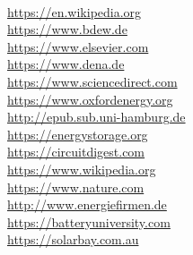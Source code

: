 \begin{parcolumns}[colwidths={1=5 cm, 2=10 cm}]{2}
{\\ \url{https://en.wikipedia.org} \\ \url{https://www.bdew.de} \\ \url{https://www.elsevier.com} \\ \url{https://www.dena.de} \\ \url{https://www.sciencedirect.com} \\ \url{https://www.oxfordenergy.org} \\ \url{http://epub.sub.uni-hamburg.de}
\\ \url{https://energystorage.org} \\ \url{https://circuitdigest.com} \\ \url{https://www.wikipedia.org} \\ \url{https://www.nature.com} \\ \url{http://www.energiefirmen.de} \\ \url{https://batteryuniversity.com} \\ \url{https://solarbay.com.au} \\
}
\end{parcolumns}
\clearpage

